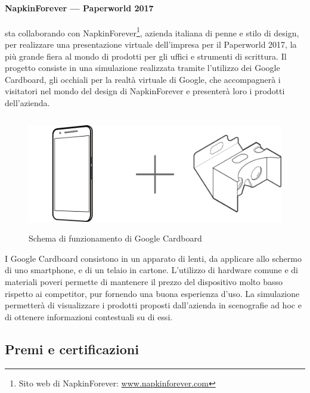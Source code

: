    \paragraph{NapkinForever --- Paperworld 2017}
   \nomeAzienda{} sta collaborando con NapkinForever\footnote{Sito web di NapkinForever: \href{www.napkinforever.com}{www.napkinforever.com}}, azienda italiana di penne e stilo di design, per realizzare una presentazione virtuale dell'impresa per il Paperworld 2017, la più grande fiera al mondo di prodotti per gli uffici e strumenti di scrittura. Il progetto consiste in una simulazione realizzata tramite l'utilizzo dei Google Cardboard, gli occhiali per la realtà virtuale di Google, che accompagnerà i visitatori nel mondo del design di NapkinForever e presenterà loro i prodotti dell'azienda.
   \begin{figure}[H]
      \begin{center}
         \includegraphics[width=15cm,height=5cm,keepaspectratio]{immagini/cardboard-schema}
      \end{center}
      \caption{Schema di funzionamento di Google Cardboard}\label{schemacardboard}
   \end{figure}
   I Google Cardboard consistono in un apparato di lenti, da applicare allo schermo di uno smartphone, e di un telaio in cartone. L'utilizzo di hardware comune e di materiali poveri permette di mantenere il prezzo del dispositivo molto basso rispetto ai competitor, pur fornendo una buona esperienza d'uso. La simulazione permetterà di visualizzare i prodotti proposti dall'azienda in scenografie ad hoc e di ottenere informazioni contestuali su di essi.

   \subsection{Premi e certificazioni}

